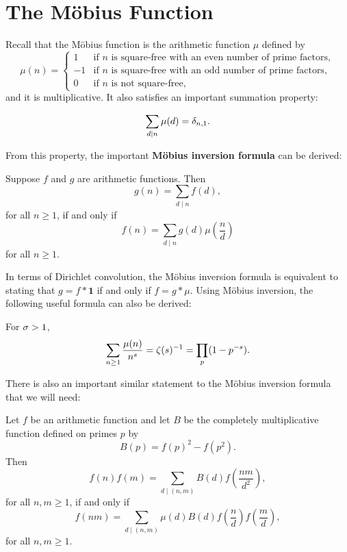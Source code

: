  \section{The M\"obius Function}\label{append:The_Mobius_Function}
    Recall that the M\"obius function is the arithmetic function $\mu$ defined by
    \[
      \mu(n) = \begin{cases} 1 & \text{if $n$ is square-free with an even number of prime factors}, \\ -1 & \text{if $n$ is square-free with an odd number of prime factors}, \\ 0 & \text{if $n$ is not square-free}, \end{cases}
    \]
    and it is multiplicative. It also satisfies an important summation property:

    \begin{proposition}\label{prop:Mobius_dirac_delta}
      \[
        \sum_{d \mid n}\mu(d) = \delta_{n,1}.
      \]
    \end{proposition}

    From this property, the important \textbf{M\"obius inversion formula} can be derived:

    \begin{theorem*}
      Suppose $f$ and $g$ are arithmetic functions. Then
      \[
        g(n) = \sum_{d \mid n}f(d),
      \]
      for all $n \ge 1$, if and only if
      \[
        f(n) = \sum_{d \mid n}g(d)\mu\left(\frac{n}{d}\right)
      \]
      for all $n \ge 1$.
    \end{theorem*}

    In terms of Dirichlet convolution, the M\"obius inversion formula is equivalent to stating that $g = f \ast \mathbf{1}$ if and only if $f = g \ast \mu$. Using M\"obius inversion, the following useful formula can also be derived:

    \begin{proposition}\label{prop:Dirichlet_Mobius_is_zeta_inverse}
      For $\sigma > 1$,
      \[
        \sum_{n \ge 1}\frac{\mu(n)}{n^{s}} = \zeta(s)^{-1} = \prod_{p}(1-p^{-s}).
      \]
    \end{proposition}

    There is also an important similar statement to the M\"obius inversion formula that we will need:

    \begin{theorem}\label{thm:specially_multiplicative_functions}
      Let $f$ be an arithmetic function and let $B$ be the completely multiplicative function defined on primes $p$ by
      \[
        B(p) = f(p)^{2}-f(p^{2}).
      \]
      Then
      \[
        f(n)f(m) = \sum_{d \mid (n,m)}B(d)f\left(\frac{nm}{d^{2}}\right),
      \]
      for all $n,m \ge 1$, if and only if
      \[
        f(nm) = \sum_{d \mid (n,m)}\mu(d)B(d)f\left(\frac{n}{d}\right)f\left(\frac{m}{d}\right),
      \]
      for all $n,m \ge 1$.
    \end{theorem}


